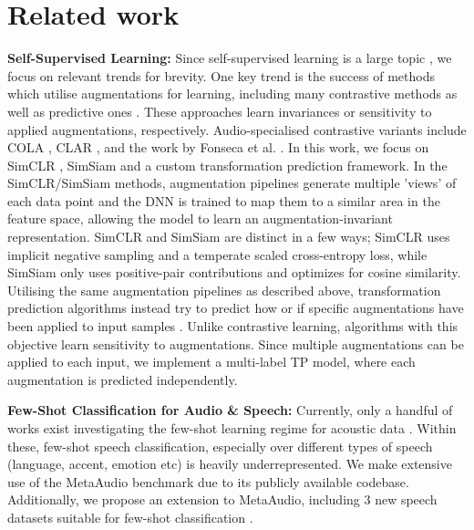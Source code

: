 \documentclass{INTERSPEECH2023}
\begin{document}
\section{Related work}
\textbf{Self-Supervised Learning:} Since self-supervised learning is a large topic \cite{linus_survey,ssl_audio_survey,ssl_speech_survey}, we focus on relevant trends for brevity. One key trend is the success of methods which utilise augmentations for learning, including many contrastive methods \cite{simclr,simsiam,moco,barlow_twins} as well as predictive ones \cite{rot_net}. These approaches learn invariances or sensitivity to applied augmentations, respectively. Audio-specialised contrastive variants include COLA \cite{cola}, CLAR \cite{clar}, and the work by Fonseca et al. \cite{ucl_ser}. In this work, we focus on SimCLR \cite{simclr}, SimSiam \cite{simsiam} and a custom transformation prediction framework. In the SimCLR/SimSiam methods, augmentation pipelines generate multiple 'views' of each data point and the DNN is trained to map them to a similar area in the feature space, allowing the model to learn an augmentation-invariant representation. SimCLR \cite{simclr} and SimSiam \cite{simsiam} are distinct in a few ways; SimCLR uses implicit negative sampling and a temperate scaled cross-entropy loss, while SimSiam only uses positive-pair contributions and optimizes for cosine similarity. Utilising the same augmentation pipelines as described above, transformation prediction algorithms instead try to predict how or if specific augmentations have been applied to input samples \cite{rot_net}. Unlike contrastive learning, algorithms with this objective learn sensitivity to augmentations. Since multiple augmentations can be applied to each input, we implement a multi-label TP model, where each augmentation is predicted independently.

\noindent\textbf{Few-Shot Classification for Audio \& Speech:} Currently, only a handful of works exist investigating the few-shot learning regime for acoustic data \cite{transient, fs_fsd, metaaudio}. Within these, few-shot speech classification, especially over different types of speech (language, accent, emotion etc) is heavily underrepresented. We make extensive use of the MetaAudio \cite{metaaudio} benchmark due to its publicly available codebase. Additionally, we propose an extension to MetaAudio, including 3 new speech datasets suitable for few-shot classification \cite{cremad, saa, common_voice}.
\end{document}
